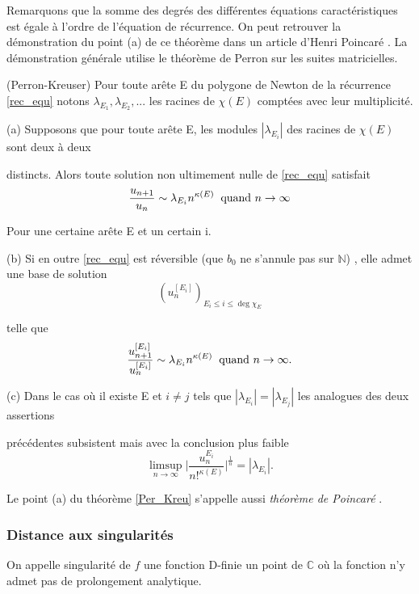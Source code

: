 \documentclass[a4paper,10pt]{article}
\begin{document}
	Remarquons que la somme des degrés des différentes équations caractéristiques est égale à l'ordre de l'équation de récurrence. On peut retrouver la démonstration du point (a) de ce théorème dans un article d'Henri Poincaré \cite{hp1885aj}. La démonstration générale utilise le théorème de Perron sur les suites matricielles.
	\begin{theorem} (Perron-Kreuser)
		Pour toute arête E du polygone de Newton de la récurrence \eqref{rec_equ} notons $\lambda_{E_{1}},\lambda_{E_{2}},...$ les racines de $\chi(E)$ comptées avec leur multiplicité.
		
		(a) Supposons que pour toute arête E, les modules $|\lambda_{E_{i}}|$ des racines de $\chi(E)$ sont deux à deux
		
		distincts. Alors toute solution non ultimement nulle de \eqref{rec_equ} satisfait
		\[\frac{u_{n+1}}{u_{n}}\sim \lambda_{E_{i}}n^{\kappa(E)} \hspace{2mm} \text{quand } n \rightarrow \infty\]
		
		Pour une certaine arête E et un certain i.
		
		(b) Si en outre \eqref{rec_equ} est réversible (que $b_0$ ne s'annule pas sur $\mathbb{N}$) , elle admet une base de solution 
		\[(u_{n}^{[E_{i}]})_{E_{i}\leq i \leq \deg \chi_{E}}\]
		
		telle que 
		\[\frac{u_{n+1}^{[E_{i}]}}{u_{n}^{[E_{i}]}}\sim \lambda_{E_{i}} n^{\kappa(E)} \hspace{2mm} \text{quand } n \rightarrow \infty.\]
		
		(c) Dans le cas où il existe E et $i \neq j$ tels que $|\lambda_{E_{i}}|=|\lambda_{E_{j}}|$ les analogues des deux assertions
		
		précédentes subsistent mais avec la conclusion plus faible
		\[\limsup_{n \rightarrow \infty } \big|\frac{u_{n}^{E_{i}}}{n!^{\kappa(E)}}\big|^{\frac{1}{n}}=|\lambda_{E_{i}}|.\]
		\label{Per_Kreu}
	\end{theorem}
	\noindent Le point (a) du théorème \ref{Per_Kreu} s'appelle aussi \textit{théorème de Poincaré} \cite{hp1885aj}. 
	
	\subsubsection{Distance aux singularités}
	\label{subsubsingularité}
	\begin{definition}
		On appelle singularité de $f$ une fonction D-finie un point de $\mathbb{C}$ où la fonction n’y admet pas de prolongement analytique.
	\end{definition}
	
\end{document}

